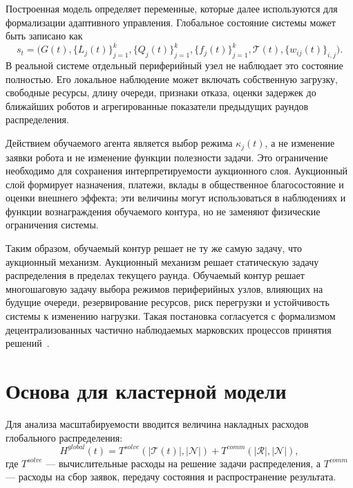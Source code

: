 Построенная модель определяет переменные, которые далее используются для формализации адаптивного управления. Глобальное состояние системы может быть записано как
\begin{equation}
    s_t=\bigl(G(t),\{L_j(t)\}_{j=1}^{k},\{Q_j(t)\}_{j=1}^{k},\{f_j(t)\}_{j=1}^{k},\mathcal{T}(t),\{w_{ij}(t)\}_{i,j}\bigr).
    \label{eq:ch2_global_state}
\end{equation}
В реальной системе отдельный периферийный узел не наблюдает это состояние полностью. Его локальное наблюдение может включать собственную загрузку, свободные ресурсы, длину очереди, признаки отказа, оценки задержек до ближайших роботов и агрегированные показатели предыдущих раундов распределения.

Действием обучаемого агента является выбор режима $\kappa_j(t)$, а не изменение заявки робота и не изменение функции полезности задачи. Это ограничение необходимо для сохранения интерпретируемости аукционного слоя. Аукционный слой формирует назначения, платежи, вклады в общественное благосостояние и оценки внешнего эффекта; эти величины могут использоваться в наблюдениях и функции вознаграждения обучаемого контура, но не заменяют физические ограничения системы.

Таким образом, обучаемый контур решает не ту же самую задачу, что аукционный механизм. Аукционный механизм решает статическую задачу распределения в пределах текущего раунда. Обучаемый контур решает многошаговую задачу выбора режимов периферийных узлов, влияющих на будущие очереди, резервирование ресурсов, риск перегрузки и устойчивость системы к изменению нагрузки. Такая постановка согласуется с формализмом децентрализованных частично наблюдаемых марковских процессов принятия решений~\cite{Oliehoek2016DecPOMDP,Bernstein2002Complexity}.

\section{Основа для кластерной модели}

Для анализа масштабируемости вводится величина накладных расходов глобального распределения:
\begin{equation}
    H^{global}(t)=T^{solve}(|\mathcal{T}(t)|,|\mathcal{N}|)+T^{comm}(|\mathcal{R}|,|\mathcal{N}|),
    \label{eq:ch2_global_overhead}
\end{equation}
где $T^{solve}$ --- вычислительные расходы на решение задачи распределения, а $T^{comm}$ --- расходы на сбор заявок, передачу состояния и распространение результата.

